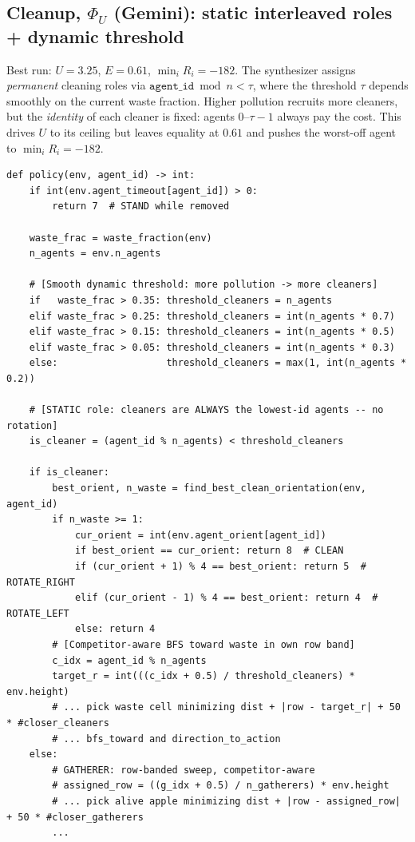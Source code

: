 \documentclass{article}
\begin{document}
\subsection{Cleanup, $\Phi_U$ (Gemini): static interleaved roles + dynamic threshold}
\label{app:policy-eff-gemini}

Best run: $U{=}3.25$, $E{=}0.61$, $\min_i R_i{=}-182$. The synthesizer assigns \emph{permanent} cleaning roles via $\texttt{agent\_id} \bmod n {<} \tau$, where the threshold $\tau$ depends smoothly on the current waste fraction. Higher pollution recruits more cleaners, but the \emph{identity} of each cleaner is fixed: agents 0--$\tau{-}1$ always pay the cost. This drives $U$ to its ceiling but leaves equality at $0.61$ and pushes the worst-off agent to $\min_i R_i{=}{-}182$.

\begin{lstlisting}[style=pythonpolicy, caption={Cleanup, $\Phi_U$ -- Gemini 3.1 Pro. Static role assignment with waste-tiered threshold (verbatim, abridged).}, label={lst:eff-gemini}]
def policy(env, agent_id) -> int:
    if int(env.agent_timeout[agent_id]) > 0:
        return 7  # STAND while removed

    waste_frac = waste_fraction(env)
    n_agents = env.n_agents

    # [Smooth dynamic threshold: more pollution -> more cleaners]
    if   waste_frac > 0.35: threshold_cleaners = n_agents
    elif waste_frac > 0.25: threshold_cleaners = int(n_agents * 0.7)
    elif waste_frac > 0.15: threshold_cleaners = int(n_agents * 0.5)
    elif waste_frac > 0.05: threshold_cleaners = int(n_agents * 0.3)
    else:                   threshold_cleaners = max(1, int(n_agents * 0.2))

    # [STATIC role: cleaners are ALWAYS the lowest-id agents -- no rotation]
    is_cleaner = (agent_id % n_agents) < threshold_cleaners

    if is_cleaner:
        best_orient, n_waste = find_best_clean_orientation(env, agent_id)
        if n_waste >= 1:
            cur_orient = int(env.agent_orient[agent_id])
            if best_orient == cur_orient: return 8  # CLEAN
            if (cur_orient + 1) % 4 == best_orient: return 5  # ROTATE_RIGHT
            elif (cur_orient - 1) % 4 == best_orient: return 4  # ROTATE_LEFT
            else: return 4
        # [Competitor-aware BFS toward waste in own row band]
        c_idx = agent_id % n_agents
        target_r = int(((c_idx + 0.5) / threshold_cleaners) * env.height)
        # ... pick waste cell minimizing dist + |row - target_r| + 50 * #closer_cleaners
        # ... bfs_toward and direction_to_action
    else:
        # GATHERER: row-banded sweep, competitor-aware
        # assigned_row = ((g_idx + 0.5) / n_gatherers) * env.height
        # ... pick alive apple minimizing dist + |row - assigned_row| + 50 * #closer_gatherers
        ...
\end{lstlisting}
\end{document}
